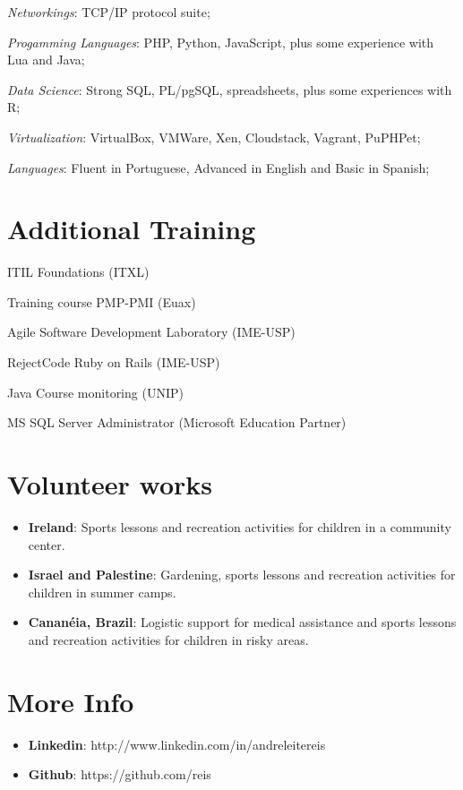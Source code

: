 \documentclass[margin]{res}
\begin{document}
\begin{resume}
			\textit{Networkings}: TCP/IP protocol suite;
  
			\textit{Progamming Languages}: PHP, Python, JavaScript, plus some experience with Lua and Java;

      \textit{Data Science}: Strong SQL, PL/pgSQL, spreadsheets, plus some experiences with R;
  
			\textit{Virtualization}: VirtualBox, VMWare, Xen, Cloudstack, Vagrant, PuPHPet;

			\textit{Languages}: Fluent in Portuguese, Advanced in English and Basic in Spanish;


\section{Additional Training}
    \vspace{2mm}
      ITIL Foundations (ITXL)

      Training course PMP-PMI (Euax)

      Agile Software Development Laboratory (IME-USP)

      RejectCode Ruby on Rails (IME-USP)

      Java Course monitoring (UNIP)

      MS SQL Server Administrator (Microsoft Education Partner)
  
\section{Volunteer works}
		\begin{itemize}
		    \vspace{2mm}
		    \item \textbf{Ireland}: Sports lessons and recreation activities for children in a community center.\vspace{1mm}
		    \item \textbf{Israel and Palestine}: Gardening, sports lessons and recreation activities for children in summer camps.\vspace{1mm}
		    \item \textbf{Cananéia, Brazil}: Logistic support for medical assistance and sports lessons and recreation activities for children in risky areas.
		\end{itemize}
 
\section{More Info}
    \begin{itemize}
        \item \textbf{Linkedin}: http://www.linkedin.com/in/andreleitereis
        \item \textbf{Github}: https://github.com/reis
    \end{itemize}


\end{resume} 
\end{document}

